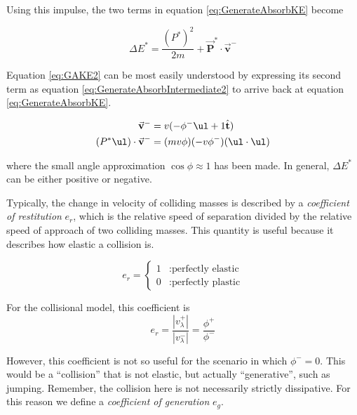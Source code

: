 Using this impulse, the two terms in equation \ref{eq:GenerateAbsorbKE} become

\begin{equation}
\Delta E^{*} = \frac{ (P^{*})^{2}}{2m} + \vec{\mathbf{P}}^{*} \cdot \vec{\mathbf{v}}^{-}
\label{eq:GAKE2}
\end{equation}

Equation \ref{eq:GAKE2} can be most easily understood by expressing its second term as equation \ref{eq:GenerateAbsorbIntermediate2} to arrive back at equation \ref{eq:GenerateAbsorbKE}.

\begin{align}
\vec{\mathbf{v}}^{-} &= v(-\phi^{-} \ul + 1\hat{\mathbf{t}}) \label{eq:GenerateAbsorbIntermediate1} \\
(P^{*} \ul) \cdot \vec{\mathbf{v}}^{-} &= (mv\phi)(-v\phi^{-})(\ul \cdot \ul) \label{eq:GenerateAbsorbIntermediate2}
\end{align}

where the small angle approximation $\cos{\phi} \approx 1$ has been made. In general, $\Delta E^{*}$ can be either positive or negative. 

Typically, the change in velocity of colliding masses is described by a \textit{coefficient of restitution} $e_{r}$, which is the relative speed of separation divided by the relative speed of approach of two colliding masses. This quantity is useful because it describes how elastic a collision is.

\begin{displaymath}
   e_{r} = \left\{
     \begin{array}{lr}
       1 & : \mbox{perfectly elastic}\\
       0 & : \mbox{perfectly plastic}
     \end{array}
   \right.
\end{displaymath}

For the collisional model, this coefficient is 
\begin{displaymath}
e_{r} = \frac{|v_{\lambda}^{+}|}{|v_{\lambda}^{-}|} = \frac{\phi^{+}}{\phi^{-}}
\end{displaymath}

However, this coefficient is not so useful for the scenario in which $\phi^{-} = 0$. This would be a ``collision'' that is not elastic, but actually ``generative'', such as jumping. Remember, the collision here is not necessarily strictly dissipative. For this reason we define a \textit{coefficient of generation} $e_{g}$.  

